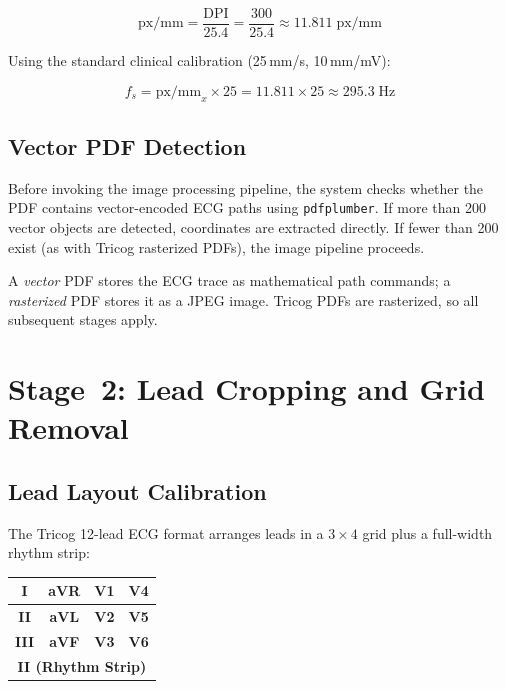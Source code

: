 \documentclass[conference]{IEEEtran}
\begin{document}
\begin{equation}
  \text{px/mm} = \frac{\text{DPI}}{25.4}
  = \frac{300}{25.4}
  \approx 11.811 \;\text{px/mm}
\end{equation}

Using the standard clinical calibration (25\,mm/s, 10\,mm/mV):

\begin{equation}
  f_s = \text{px/mm}_x \times 25
      = 11.811 \times 25 \approx 295.3\;\text{Hz}
\end{equation}

\subsection{Vector PDF Detection}

Before invoking the image processing pipeline, the system checks whether the
PDF contains vector-encoded ECG paths using \texttt{pdfplumber}. If more than
200 vector objects are detected, coordinates are extracted directly. If fewer
than 200 exist (as with Tricog rasterized PDFs), the image pipeline proceeds.

A \textit{vector} PDF stores the ECG trace as mathematical path commands; a
\textit{rasterized} PDF stores it as a JPEG image. Tricog PDFs are
rasterized, so all subsequent stages apply.

\section{Stage~2: Lead Cropping and Grid Removal}

\subsection{Lead Layout Calibration}

The Tricog 12-lead ECG format arranges leads in a $3 \times 4$ grid plus a
full-width rhythm strip:

\begin{center}
\footnotesize
\begin{tabular}{|c|c|c|c|}
  \hline
  \textbf{I} & \textbf{aVR} & \textbf{V1} & \textbf{V4} \\
  \hline
  \textbf{II} & \textbf{aVL} & \textbf{V2} & \textbf{V5} \\
  \hline
  \textbf{III} & \textbf{aVF} & \textbf{V3} & \textbf{V6} \\
  \hline
  \multicolumn{4}{|c|}{\textbf{II (Rhythm Strip)}} \\
  \hline
\end{tabular}
\end{center}
\end{document}
